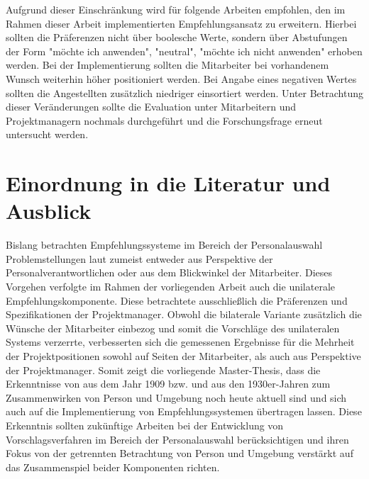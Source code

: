 Aufgrund dieser Einschränkung wird für folgende Arbeiten empfohlen, den im Rahmen dieser Arbeit implementierten Empfehlungsansatz zu erweitern. Hierbei sollten die Präferenzen nicht über boolesche Werte, sondern über Abstufungen der Form "möchte ich anwenden", "neutral", "möchte ich nicht anwenden" erhoben werden. Bei der Implementierung sollten die Mitarbeiter bei vorhandenem Wunsch weiterhin höher positioniert werden. Bei Angabe eines negativen Wertes sollten die Angestellten zusätzlich niedriger einsortiert werden. Unter Betrachtung dieser Veränderungen sollte die Evaluation unter Mitarbeitern und Projektmanagern nochmals durchgeführt und die Forschungsfrage erneut untersucht werden.

\section{Einordnung in die Literatur und Ausblick}
\label{ch:diskussion:einordnung}
Bislang betrachten Empfehlungssysteme im Bereich der Personalauswahl Problemstellungen laut \textcite[S. 1ff.]{malinowski:2006} zumeist entweder aus Perspektive der Personalverantwortlichen oder aus dem Blickwinkel der Mitarbeiter. Dieses Vorgehen verfolgte im Rahmen der vorliegenden Arbeit auch die unilaterale Empfehlungskomponente. Diese betrachtete ausschließlich die Präferenzen und Spezifikationen der Projektmanager. Obwohl die bilaterale Variante zusätzlich die Wünsche der Mitarbeiter einbezog und somit die Vorschläge des unilateralen Systems verzerrte, verbesserten sich die gemessenen Ergebnisse für die Mehrheit der Projektpositionen sowohl auf Seiten der Mitarbeiter, als auch aus Perspektive der Projektmanager. Somit zeigt die vorliegende Master-Thesis, dass die Erkenntnisse von \textcite[S. 5ff.]{parsons:1909} aus dem Jahr 1909 bzw. \textcite[S. 11f.]{lewin:1936} und \textcite[S. 38ff.]{murray:1938} aus den 1930er-Jahren zum Zusammenwirken von Person und Umgebung noch heute aktuell sind und sich auch auf die Implementierung von Empfehlungssystemen übertragen lassen. Diese Erkenntnis sollten zukünftige Arbeiten bei der Entwicklung von Vorschlagsverfahren im Bereich der Personalauswahl berücksichtigen und ihren Fokus von der getrennten Betrachtung von Person und Umgebung verstärkt auf das Zusammenspiel beider Komponenten richten. 
